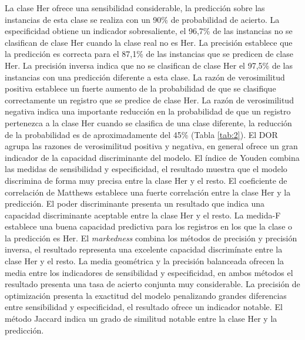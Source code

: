 La clase Her ofrece una sensibilidad considerable, la predicción sobre las instancias de esta clase se realiza con un 90\% de probabilidad de acierto. La especificidad obtiene un indicador sobresaliente, el 96,7\% de las instancias no se clasifican de clase Her cuando la clase real no es Her. La precisión establece que la predicción es correcta para el 87,1\% de las instancias que se predicen de clase Her. La precisión inversa indica que no se clasifican de clase Her el 97,5\% de las instancias con una predicción diferente a esta clase. La razón de verosimilitud positiva establece un fuerte aumento de la probabilidad de que se clasifique correctamente un registro que se predice de clase Her. La razón de verosimilitud negativa indica una importante reducción en la probabilidad de que un registro pertenezca a la clase Her cuando se clasifica de una clase diferente, la reducción de la probabilidad es de aproximadamente del 45\% (Tabla \ref{tab:2}). El DOR agrupa las razones de verosimilitud positiva y negativa, en general ofrece un gran indicador de la capacidad discriminante del modelo. El índice de Youden combina las medidas de sensibilidad y especificidad, el resultado muestra que el modelo discrimina de forma muy precisa entre la clase Her y el resto. El coeficiente de correlación de Matthews establece una fuerte correlación entre la clase Her y la predicción. El poder discriminante presenta un resultado que indica una capacidad discriminante aceptable entre la clase Her y el resto. La medida-F establece una buena capacidad predictiva para los registros en los que la clase o la predicción es Her. El \textit{markedness} combina los métodos de precisión y precisión inversa, el resultado representa una excelente capacidad discrimínate entre la clase Her y el resto. La media geométrica y la precisión balanceada ofrecen la media entre los indicadores de sensibilidad y especificidad, en ambos métodos el resultado presenta una tasa de acierto conjunta muy considerable. La precisión de optimización presenta la exactitud del modelo penalizando grandes diferencias entre sensibilidad y especificidad, el resultado ofrece un indicador notable. El método Jaccard indica un grado de similitud notable entre la clase Her y la predicción.

\bigbreak

